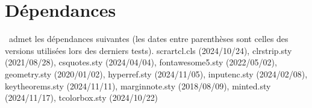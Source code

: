 \section{Dépendances}

\thisproj\ admet les dépendances suivantes (les dates entre parenthèses sont celles des versions utilisées lors des derniers tests).
scrartcl.cls (2024/10/24), clrstrip.sty (2021/08/28), csquotes.sty (2024/04/04), fontawesome5.sty (2022/05/02), geometry.sty (2020/01/02), hyperref.sty (2024/11/05), inputenc.sty (2024/02/08), keytheorems.sty (2024/11/11), marginnote.sty (2018/08/09), minted.sty (2024/11/17), tcolorbox.sty (2024/10/22)
